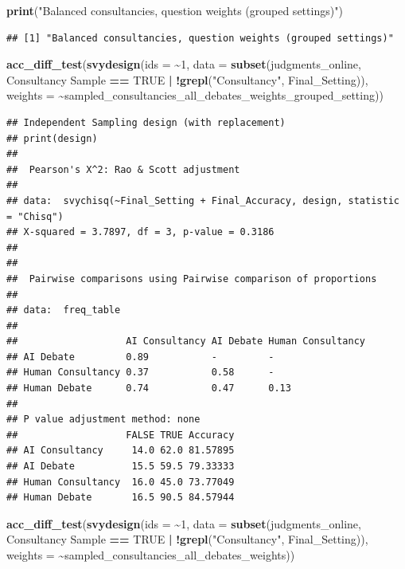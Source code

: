 \documentclass[
]{article}
\newenvironment{Shaded}{\begin{snugshade}}{\end{snugshade}}
\newcommand{\AttributeTok}[1]{\textcolor[rgb]{0.13,0.29,0.53}{#1}}
\newcommand{\ConstantTok}[1]{\textcolor[rgb]{0.56,0.35,0.01}{#1}}
\newcommand{\DecValTok}[1]{\textcolor[rgb]{0.00,0.00,0.81}{#1}}
\newcommand{\FunctionTok}[1]{\textcolor[rgb]{0.13,0.29,0.53}{\textbf{#1}}}
\newcommand{\NormalTok}[1]{#1}
\newcommand{\SpecialCharTok}[1]{\textcolor[rgb]{0.81,0.36,0.00}{\textbf{#1}}}
\newcommand{\StringTok}[1]{\textcolor[rgb]{0.31,0.60,0.02}{#1}}
\begin{document}
\begin{Shaded}
\begin{Highlighting}[]
\FunctionTok{print}\NormalTok{(}\StringTok{"Balanced consultancies, question weights (grouped settings)"}\NormalTok{)}
\end{Highlighting}
\end{Shaded}

\begin{verbatim}
## [1] "Balanced consultancies, question weights (grouped settings)"
\end{verbatim}

\begin{Shaded}
\begin{Highlighting}[]
\FunctionTok{acc\_diff\_test}\NormalTok{(}\FunctionTok{svydesign}\NormalTok{(}\AttributeTok{ids =} \SpecialCharTok{\textasciitilde{}}\DecValTok{1}\NormalTok{, }\AttributeTok{data =} \FunctionTok{subset}\NormalTok{(judgments\_online, }\StringTok{\textasciigrave{}}\AttributeTok{Consultancy Sample}\StringTok{\textasciigrave{}} \SpecialCharTok{==} \ConstantTok{TRUE} \SpecialCharTok{|} \SpecialCharTok{!}\FunctionTok{grepl}\NormalTok{(}\StringTok{"Consultancy"}\NormalTok{, Final\_Setting)), }\AttributeTok{weights =} \SpecialCharTok{\textasciitilde{}}\NormalTok{sampled\_consultancies\_all\_debates\_weights\_grouped\_setting))}
\end{Highlighting}
\end{Shaded}

\begin{verbatim}
## Independent Sampling design (with replacement)
## print(design)
## 
##  Pearson's X^2: Rao & Scott adjustment
## 
## data:  svychisq(~Final_Setting + Final_Accuracy, design, statistic = "Chisq")
## X-squared = 3.7897, df = 3, p-value = 0.3186
## 
## 
##  Pairwise comparisons using Pairwise comparison of proportions 
## 
## data:  freq_table 
## 
##                   AI Consultancy AI Debate Human Consultancy
## AI Debate         0.89           -         -                
## Human Consultancy 0.37           0.58      -                
## Human Debate      0.74           0.47      0.13             
## 
## P value adjustment method: none 
##                   FALSE TRUE Accuracy
## AI Consultancy     14.0 62.0 81.57895
## AI Debate          15.5 59.5 79.33333
## Human Consultancy  16.0 45.0 73.77049
## Human Debate       16.5 90.5 84.57944
\end{verbatim}

\begin{Shaded}
\begin{Highlighting}[]
\FunctionTok{acc\_diff\_test}\NormalTok{(}\FunctionTok{svydesign}\NormalTok{(}\AttributeTok{ids =} \SpecialCharTok{\textasciitilde{}}\DecValTok{1}\NormalTok{, }\AttributeTok{data =} \FunctionTok{subset}\NormalTok{(judgments\_online, }\StringTok{\textasciigrave{}}\AttributeTok{Consultancy Sample}\StringTok{\textasciigrave{}} \SpecialCharTok{==} \ConstantTok{TRUE} \SpecialCharTok{|} \SpecialCharTok{!}\FunctionTok{grepl}\NormalTok{(}\StringTok{"Consultancy"}\NormalTok{, Final\_Setting)), }\AttributeTok{weights =} \SpecialCharTok{\textasciitilde{}}\NormalTok{sampled\_consultancies\_all\_debates\_weights))}
\end{Highlighting}
\end{Shaded}
\end{document}
